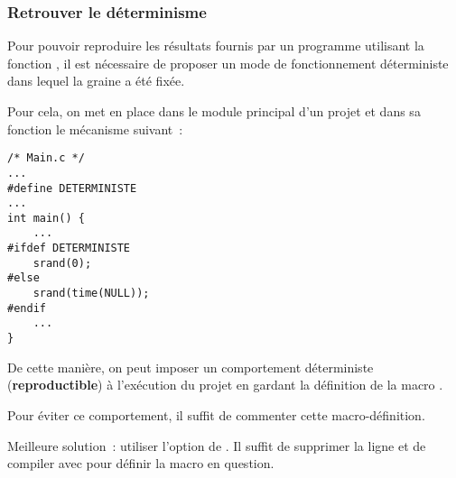 \begin{frame}[fragile]\frametitle{Retrouver le déterminisme}
Pour pouvoir reproduire les résultats fournis par un programme utilisant
la fonction , il est nécessaire de proposer un
\alert{mode de fonctionnement déterministe} dans lequel la graine a été
fixée.
\medskip

Pour cela, on met en place dans le module principal d'un projet et dans sa
fonction  le mécanisme suivant~:
\begin{multicols}{2}
\begin{center}
\begin{minipage}[c]{.35\textwidth}
\begin{lstlisting}[frame=single,numbers=none,basicstyle=\scriptsize\tt]
/* Main.c */
...
#define DETERMINISTE
...
int main() {
    ...
#ifdef DETERMINISTE
    srand(0);
#else
    srand(time(NULL));
#endif
    ...
}
\end{lstlisting}
\end{minipage}
\end{center}
De cette manière, on peut imposer un comportement déterministe
({\bf reproductible}) à l'exécution du projet en gardant la définition
de la macro .
\smallskip

Pour éviter ce comportement, il suffit de commenter cette macro-définition.
\end{multicols}

\begin{footnotesize}
Meilleure solution~: utiliser l'option  de . Il
suffit de supprimer la ligne  et de compiler
avec  pour définir la macro en question.
\end{footnotesize}
\end{frame}
